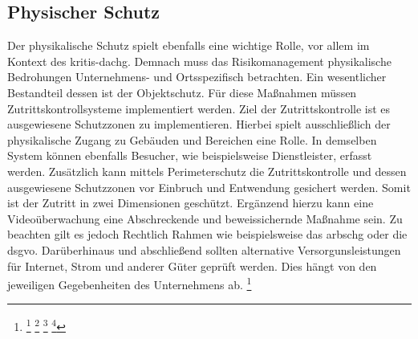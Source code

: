 \documentclass[11pt,a4paper,hidelinks]{article}   %
\begin{document}
        \subsection{Physischer Schutz}
        Der physikalische Schutz spielt ebenfalls eine wichtige Rolle, vor allem im Kontext des \gls{kritis-dachg}. Demnach muss das Risikomanagement physikalische Bedrohungen Unternehmens- und Ortsspezifisch betrachten. Ein wesentlicher Bestandteil dessen ist der Objektschutz. Für diese Maßnahmen müssen Zutrittskontrollsysteme implementiert werden. Ziel der Zutrittskontrolle ist es ausgewiesene Schutzzonen zu implementieren. Hierbei spielt ausschließlich der physikalische Zugang zu Gebäuden und Bereichen eine Rolle. In demselben System können ebenfalls Besucher, wie beispielsweise Dienstleister, erfasst werden. Zusätzlich kann mittels Perimeterschutz die Zutrittskontrolle und dessen ausgewiesene Schutzzonen vor Einbruch und Entwendung gesichert werden. Somit ist der Zutritt in zwei Dimensionen geschützt. Ergänzend hierzu kann eine Videoüberwachung eine Abschreckende und beweissichernde Maßnahme sein. Zu beachten gilt es jedoch Rechtlich Rahmen wie beispielsweise das \gls{arbschg} oder die \gls{dsgvo}. Darüberhinaus und abschließend sollten alternative Versorgunsleistungen für Internet, Strom und anderer Güter geprüft werden. Dies hängt von den jeweiligen Gegebenheiten des Unternehmens ab.
        \footnote{
            \footcite[Vgl. S. 255 - 257, 260 - 261, 401 - 410][]{9780128044629}
            \footcite[Vgl. S. 183, 199 - 208,][]{9780123878465}
            \footcite[Vgl. §3 - §5][]{ArbSchG}
            \footcite[Vgl. Art. 5][]{EU2016-679}
        }
    \newpage
\end{document}
